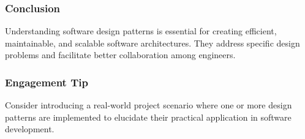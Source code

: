 \documentclass{beamer}
\begin{document}
\begin{frame}[fragile]
    \frametitle{Conclusion}
    Understanding software design patterns is essential for creating efficient, maintainable, and scalable software architectures. They address specific design problems and facilitate better collaboration among engineers.
\end{frame}

\begin{frame}[fragile]
    \frametitle{Engagement Tip}
    Consider introducing a real-world project scenario where one or more design patterns are implemented to elucidate their practical application in software development.
\end{frame}
\end{document}
